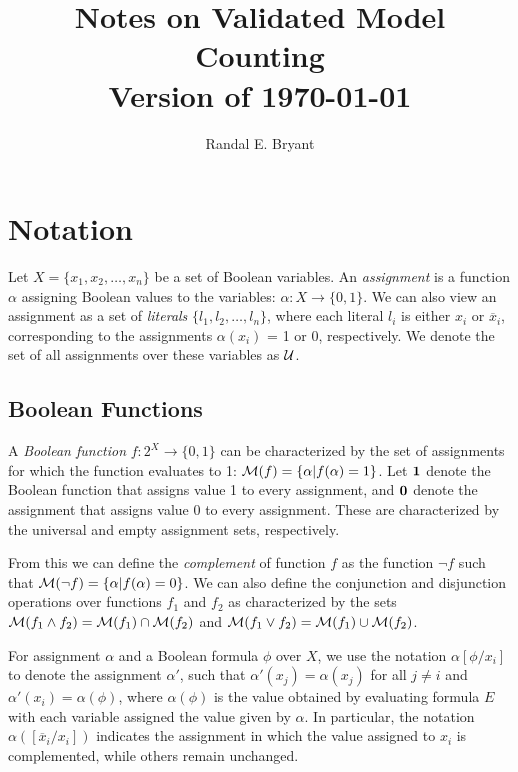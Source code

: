 \documentclass{llncs}
\title{Notes on Validated Model Counting \\ Version of \today}
\author{Randal E. Bryant}
\institute{
Computer Science Department \\
Carnegie Mellon University, Pittsburgh, PA, United States
}
\newcommand{\one}{\mbox{\bf 1}}
\newcommand{\zero}{\mbox{\bf 0}}
\newcommand{\booland}{\land}
\newcommand{\boolor}{\lor}
\newcommand{\boolnot}{\neg}
\newcommand{\tautology}{1}
\newcommand{\nil}{0}
\newcommand{\obar}[1]{\overline{#1}}
\newcommand{\interp}{\alpha}
\newcommand{\uinterp}{{\cal U}}
\newcommand{\interpset}[1]{{\cal M}(#1)}
\newcommand{\subs}[2]{[#2/#1]}
\begin{document}
\maketitle

\section{Notation}

Let $X = \{x_1, x_2, \ldots, x_n\}$ be a set of Boolean variables.  An
{\em assignment} is a function $\interp$ assigning Boolean values to
the variables: $\interp:X \rightarrow \{\nil, \tautology\}$.  We can
also view an assignment as a set of {\em literals} $\{l_1, l_2,
\ldots, l_n\}$, where each literal $l_i$ is either $x_i$ or
$\obar{x}_i$, corresponding to the assignments $\interp(x_i)$ = 1 or 0,
respectively.  We denote the set of all assignments over these variables as $\uinterp$.

\subsection{Boolean Functions}

A {\em Boolean function} $f:2^X \rightarrow \{0,1\}$ can be
characterized by the set of assignments for which the function
evaluates to 1: $\interpset{f} = \{ \interp | f(\interp) = 1\}$.  Let
$\one$ denote the Boolean function that assigns value 1 to every
assignment, and $\zero$ denote the assignment that assigns value 0 to
every assignment.  These are characterized by the universal and empty
assignment sets, respectively.


From
this we can define the {\em complement} of function $f$ as the function
$\boolnot f$ such that
$\interpset{\boolnot f} = \{ \interp | f(\interp) = 0\}$.
We can also define the conjunction and disjunction operations over functions $f_1$ and $f_2$ as characterized by the sets
$\interpset{f_1 \booland f_2} = \interpset{f_1} \cap \interpset{f_2}$ and
$\interpset{f_1 \boolor f_2} = \interpset{f_1} \cup \interpset{f_2}$.

For assignment $\interp$ and a Boolean formula $\phi$ over $X$, we
use the notation $\interp\subs{x_i}{\phi}$ to denote the assignment
$\interp'$, such that $\interp'(x_j) = \interp(x_j)$ for all $j \not = i$
and $\interp'(x_i) = \interp(\phi)$, where $\interp(\phi)$ is the value obtained by evaluating formula $E$ with each variable assigned the value given by $\interp$.
In particular, the notation
$\interp(\subs{x_i}{\obar{x}_i})$
indicates the assignment in which the value
assigned to $x_i$ is complemented, while others remain unchanged.
\end{document}
